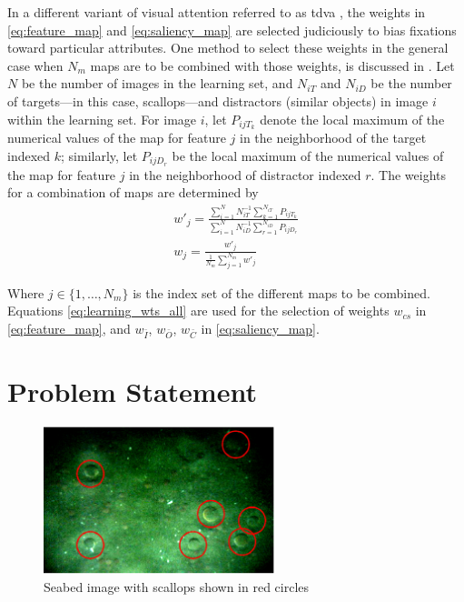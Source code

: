 \documentclass {udthesis}
\begin{document}
In a different variant of visual attention referred to as \gls{tdva} \cite{navalpakkam},
the weights in \eqref{eq:feature_map} and \eqref{eq:saliency_map}
are selected judiciously to bias fixations toward particular attributes. One method to select these weights in the general case when $N_m$ maps are to be combined with those weights, is discussed in \cite{navalpakkam}.
Let $N$ be the number of images in the learning set,
and $N_{iT}$ and $N_{iD}$ be the number of targets---in this case, scallops---and distractors 
(similar objects) in image $i$ within the learning set.
For image $i$, let $P_{ijT_{k}}$ denote the local maximum of the numerical values of the map for feature $j$ in the neighborhood of the target indexed $k$;
similarly, let $P_{ijD_{r}}$ be the local maximum of the numerical values of the map for feature $j$ in the neighborhood of distractor indexed $r$.
The weights for a combination of maps are determined by
\begin{align} \label{eq:learning_wts_all}
w'_{j}=\frac{\sum_{i=1}^{N} N_{iT}^{-1}\sum_{k=1}^{N_{iT}}P_{ijT_{k}} }{
\sum_{i=1}^{N} N_{iD}^{-1} \sum_{r=1}^{N_{iD}}P_{ijD_{r}}} \\
w_{j}=\frac{w'_{j}}{\frac{1}{N_m} \sum_{j=1}^{N_{m}}w'_{j} }
\end{align}

Where $j\in\{1,\ldots,N_{m}\}$ is the index set of the different maps to be combined. 
Equations \eqref{eq:learning_wts_all} are used for the selection of weights $w_{cs}$ in \eqref{eq:feature_map}, and $w_{\bar{I}}$, $w_{\bar{O}}$, $w_{\bar{C}}$ in 
\eqref{eq:saliency_map}.

\section{Problem Statement}

\begin{figure}
      \centering
      \includegraphics[width=0.6\textwidth]{scallopred}
      \caption{\cite{prasanna_aslo} Seabed image with scallops shown in red circles}
      \label{fig:scallopred}
\end{figure} 
\end{document}
